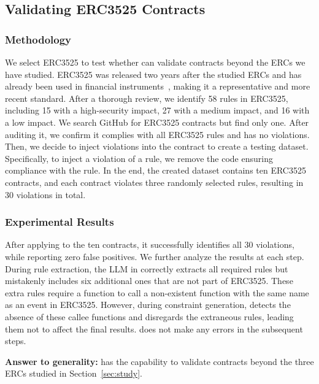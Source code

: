 \subsection{Validating ERC3525 Contracts}
\label{sec:3525}


\subsubsection{Methodology}

We select ERC3525 to test whether \Tool{} can validate contracts beyond 
the ERCs we have studied. 
ERC3525 was released two years after the studied ERCs 
and has already been used in financial instruments~\cite{fujidao,bufferfinance}, 
making it a representative and more recent standard. 
After a thorough review, we identify 58 rules in ERC3525, 
including 15 with a high-security impact, 
27 with a medium impact, and 16 with a low impact.
We search GitHub for ERC3525 contracts but find only one. 
After auditing it, we confirm it complies with all ERC3525 rules and has no violations. 
Then, we decide to inject violations into the contract to create a testing dataset. 
Specifically, to inject a violation of a rule, we remove the code 
ensuring compliance with the rule. 
In the end, the created dataset contains ten ERC3525 contracts, and each contract 
violates three randomly selected rules, 
resulting in 30 violations in total.


\subsubsection{Experimental Results}
After applying \Tool{} to the ten contracts, 
it successfully identifies all 30 violations, 
while reporting zero false positives. 
We further analyze the results at each step. 
During rule extraction, the LLM in \Tool{} correctly extracts all required 
rules but mistakenly includes six additional ones that are not part of ERC3525. 
These extra rules require a function to call a non-existent function with the same name 
as an event in ERC3525. However, during constraint generation, 
\Tool{} detects the absence of these callee functions and disregards the extraneous rules, leading them not to affect the final results. \Tool{} does not make 
any errors in the subsequent steps.



\begin{tcolorbox}[size=title]
{\textbf{Answer to generality:} 
\Tool{} has the capability to validate contracts beyond the three ERCs studied in Section~\ref{sec:study}. }
\end{tcolorbox}


